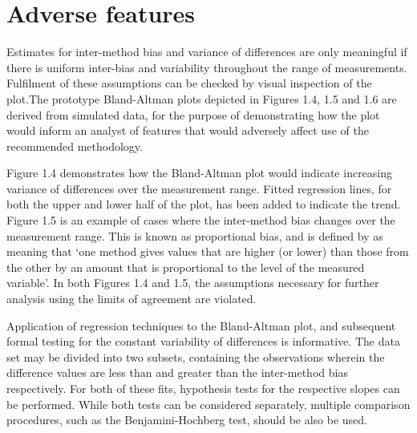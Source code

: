 \documentclass[12pt, a4paper]{report}
\theoremstyle{plain}
\theoremstyle{definition}
\theoremstyle{remark}
\begin{document}
	


	\section{Adverse features}
	
	Estimates for inter-method bias and variance of differences are only meaningful if there is uniform inter-bias and variability throughout the range of measurements. Fulfilment of these assumptions can be checked by visual inspection of the plot.The prototype Bland-Altman plots depicted in Figures 1.4, 1.5 and 1.6 are derived from simulated data, for the purpose of demonstrating how the plot would inform an analyst of features that would adversely affect use of the recommended methodology.
	
	Figure 1.4 demonstrates how the Bland-Altman plot would indicate
	increasing variance of differences over the measurement range.
	Fitted regression lines, for both the upper and lower half of the
	plot, has been added to indicate the trend. Figure 1.5 is an
	example of cases where the inter-method bias changes over the
	measurement range. This is known as proportional bias, and is
	defined by \citet{ludbrook97} as meaning that `one method gives
	values that are higher (or lower) than those from the other by an
	amount that is proportional to the level of the measured
	variable'. In both Figures 1.4 and 1.5, the assumptions necessary
	for further analysis using the limits of agreement are violated.
	
	Application of regression techniques to the Bland-Altman plot, and
	subsequent formal testing for the constant variability of
	differences is informative. The data set may be divided into two
	subsets, containing the observations wherein the difference values
	are less than and greater than the inter-method bias respectively.
	For both of these fits, hypothesis tests for the respective slopes
	can be performed. While both tests can be considered separately,
	multiple comparison procedures, such as the Benjamini-Hochberg
	\citep{BH} test, should be also be used.
	
	
	
\end{document}
